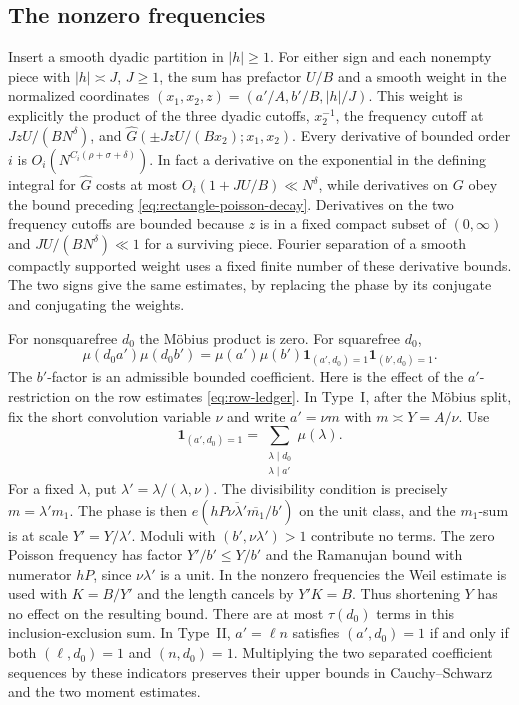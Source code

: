 \documentclass[11pt]{amsart}
\numberwithin{equation}{section}
\theoremstyle{remark}
\begin{document}
\subsection{The nonzero frequencies}

Insert a smooth dyadic partition in \(|h|\ge1\). For either sign and
each nonempty piece with \(|h|\asymp J\), \(J\ge1\), the sum has
prefactor \(U/B\) and a smooth weight in the normalized coordinates
\((x_1,x_2,z)=(a'/A,b'/B,|h|/J)\). This weight is explicitly the
product of the three dyadic cutoffs, \(x_2^{-1}\), the frequency
cutoff at \(JzU/(BN^\delta)\), and
\(\widehat G(\pm JzU/(Bx_2);x_1,x_2)\).
Every derivative of bounded order \(i\) is
\(O_i(N^{C_i(\rho+\sigma+\delta)})\). In fact a derivative on the
exponential in the defining integral for \(\widehat G\) costs at
most \(O_i(1+JU/B)\ll N^\delta\), while derivatives on \(G\)
obey the bound preceding \eqref{eq:rectangle-poisson-decay}.
Derivatives on the two frequency cutoffs are bounded because
\(z\) is in a fixed compact subset of \((0,\infty)\) and
\(JU/(BN^\delta)\ll1\) for a surviving piece. Fourier separation
of a smooth compactly supported weight uses a fixed finite number of
these derivative bounds. The two signs give the same estimates, by
replacing the phase by its conjugate and conjugating the weights.

For nonsquarefree \(d_0\) the M\"obius product is zero. For squarefree
\(d_0\),
\begin{equation}\label{eq:rectangle-moebius-gcd}
 \mu(d_0a')\mu(d_0b')
 =\mu(a')\mu(b')\mathbf 1_{(a',d_0)=1}\mathbf 1_{(b',d_0)=1}.
\end{equation}
The \(b'\)-factor is an admissible bounded coefficient. Here is the
effect of the \(a'\)-restriction on the row estimates
\eqref{eq:row-ledger}. In Type~I, after the M\"obius split, fix the
short convolution variable \(\nu\) and write \(a'=\nu m\) with
\(m\asymp Y=A/\nu\). Use
\[
 \mathbf 1_{(a',d_0)=1}
 =\sum_{\substack{\lambda\mid d_0\\\lambda\mid a'}}\mu(\lambda).
\]
For a fixed \(\lambda\), put \(\lambda'=\lambda/(\lambda,\nu)\).
The divisibility condition is precisely \(m=\lambda' m_1\).
The phase is then \(e(hP\overline{\nu\lambda'}\overline{m_1}/b')\)
on the unit class, and the \(m_1\)-sum is at scale
\(Y'=Y/\lambda'\). Moduli with \((b',\nu\lambda')>1\) contribute
no terms. The zero Poisson frequency has factor \(Y'/b'\le Y/b'\)
and the Ramanujan bound with numerator \(hP\), since
\(\nu\lambda'\) is a unit. In the nonzero frequencies the Weil
estimate is used with \(K=B/Y'\) and the length cancels by
\(Y'K=B\). Thus shortening \(Y\) has no effect on the resulting
bound. There are at most \(\tau(d_0)\) terms in this inclusion-exclusion
sum. In Type~II, \(a'=\ell n\) satisfies \((a',d_0)=1\) if and
only if both \((\ell,d_0)=1\) and \((n,d_0)=1\). Multiplying the
two separated coefficient sequences by these indicators preserves
their upper bounds in Cauchy--Schwarz and the two moment estimates.
\end{document}
